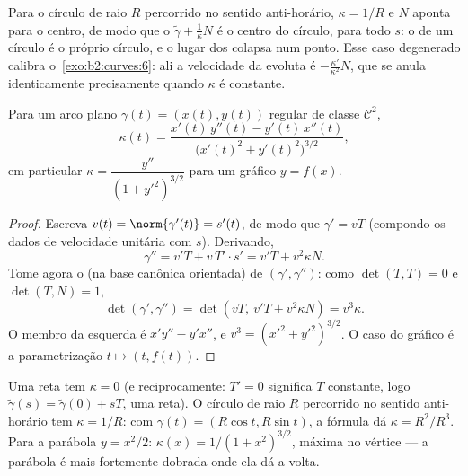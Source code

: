 \begin{example}\label{ex:b2:curves:circleevolute}
Para o círculo de raio $R$ percorrido no sentido anti-horário,
$\kappa = 1/R$ e $N$ aponta para o centro, de modo que o
 $\tilde\gamma + \frac1\kappa N$ é o
centro do círculo, para todo $s$: o 
de um círculo é o próprio círculo, e o lugar dos  colapsa num ponto. Esse caso degenerado
calibra o~\cref{exo:b2:curves:6}: ali a velocidade da evoluta
é $-\frac{\kappa'}{\kappa^2}N$, que se anula
identicamente precisamente quando $\kappa$ é constante.
\end{example}

\begin{proposition}\label{prop:b2:curves:kappaformula}
Para um arco plano $\gamma(t) = (x(t), y(t))$ regular de classe $\mathcal{C}^2$,
\[
\kappa(t)
= \frac{x'(t)\,y''(t) - y'(t)\,x''(t)}
       {\bigl(x'(t)^2 + y'(t)^2\bigr)^{3/2}} ,
\]
em particular $\kappa = \dfrac{y''}{(1 + y'^2)^{3/2}}$ para um gráfico
$y = f(x)$.
\end{proposition}

\begin{proof}
Escreva $v(t) = \norm{\gamma'(t)} = s'(t)$, de modo que $\gamma' = vT$
(compondo os dados de velocidade unitária com $s$). Derivando,
\[
\gamma'' = v'T + v\,T'\cdot s' = v'T + v^2\kappa N .
\]
Tome agora o  (na base canônica orientada) de
$(\gamma', \gamma'')$: como $\det(T, T) = 0$ e $\det(T, N) = 1$,
\[
\det(\gamma', \gamma'') = \det(vT,\ v'T + v^2\kappa N)
= v^3\kappa .
\]
O membro da esquerda é $x'y'' - y'x''$, e $v^3 = (x'^2 +
y'^2)^{3/2}$. O caso do gráfico é a parametrização $t \mapsto (t,
f(t))$.
\end{proof}

\begin{example}\label{ex:b2:curves:kappaexamples}
Uma reta tem $\kappa = 0$ (e reciprocamente: $T' = 0$ significa $T$
constante, logo $\tilde\gamma(s) = \tilde\gamma(0) + sT$, uma reta). O
círculo de raio $R$ percorrido no sentido anti-horário tem $\kappa = 1/R$:
com $\gamma(t) = (R\cos t, R\sin t)$, a fórmula dá $\kappa =
R^2/R^3$. Para a parábola $y = x^2/2$: $\kappa(x) = 1/(1 +
x^2)^{3/2}$, máxima no vértice --- a parábola é mais fortemente
dobrada onde ela dá a volta.
\end{example}

